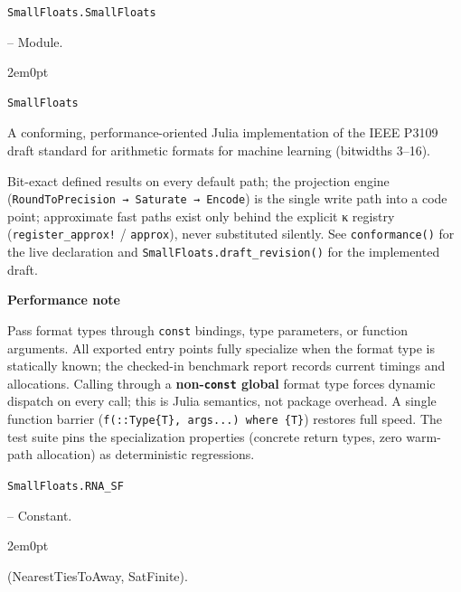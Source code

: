 \par\medskip\noindent\begin{minipage}{\linewidth}
\hypertarget{1538304370509133722}{\texttt{SmallFloats.SmallFloats}}  -- {Module.}
\nopagebreak
\begin{adjustwidth}{2em}{0pt}


\begin{verbatim}
SmallFloats
\end{verbatim}

A conforming, performance-oriented Julia implementation of the IEEE P3109 draft standard for arithmetic formats for machine learning (bitwidths 3–16).

Bit-exact defined results on every default path; the projection engine (\texttt{RoundToPrecision → Saturate → Encode}) is the single write path into a code point; approximate fast paths exist only behind the explicit κ registry (\texttt{register\_\allowbreak{}approx!} / \texttt{approx}), never substituted silently. See \texttt{conformance()} for the live declaration and \texttt{SmallFloats.draft\_\allowbreak{}revision(\allowbreak{})} for the implemented draft.

\textbf{Performance note}

Pass format types through \texttt{const} bindings, type parameters, or function arguments. All exported entry points fully specialize when the format type is statically known; the checked-in benchmark report records current timings and allocations. Calling through a \textbf{non-\texttt{const} global} format type forces dynamic dispatch on every call; this is Julia semantics, not package overhead. A single function barrier (\texttt{f(::Type\{T\}, args...) where \{T\}}) restores full speed. The test suite pins the specialization properties (concrete return types, zero warm-path allocation) as deterministic regressions.



\end{adjustwidth}
\end{minipage}
\par\medskip

\par\medskip\noindent\begin{minipage}{\linewidth}
\hypertarget{1153421143103638867}{\texttt{SmallFloats.RNA\_\allowbreak{}SF}}  -- {Constant.}
\nopagebreak
\begin{adjustwidth}{2em}{0pt}

(NearestTiesToAway, SatFinite).



\end{adjustwidth}
\end{minipage}
\par\medskip

